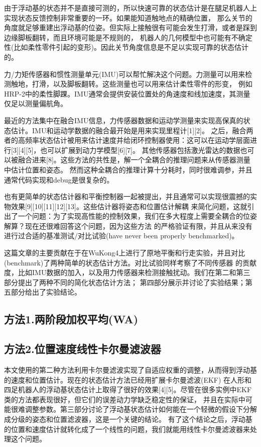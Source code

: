 由于浮动基的状态并不是直接可测的，所以快速可靠的状态估计是在腿足机器人上实现状态反馈控制非常重要的一环。如果能知道触地点的精确位置，
那么关节的角度就足够重建出浮动基的位姿。但实际上接触很有可能会发生打滑，或者是踩到边缘脚板翻转，而且环境可能是不规则的，
机器人的几何模型中也可能有不确定性(比如柔性零件引起的变形)。因此关节角度信息是不足以实现可靠的状态估计的。

力/力矩传感器和惯性测量单元(IMU)可以帮忙解决这个问题。力测量可以用来检测触地，打滑，以及脚板翻转。这些测量也可以用来估计柔性零件的形变，
例如HRP-2中的柔性脚踝。IMU通常会提供安装位置处的角速度和线加速度，其测量仅足以测量偏航角。

最近的方法集中在融合IMU信息，力传感器数据和运动学测量来实现高保真的状态估计。IMU和运动学数据的融合最开始是用来实现里程计[1][2]。
之后，融合两者的高频率状态估计被用来估计速度并给闭环控制器使用：这可以在运动学层面进行[3][4][5]，也可以扩展到动力学模型[6][7]。
其他传感器包括激光雷达的数据也可以被融合进来[8]。这些方法的共性是，解一个全耦合的推理问题来从传感器测量中估计位置和姿态。
然而这种全耦合的推理计算十分耗时，同时很难调参，并且通常代码实现和debug是很复杂的。

也有更简单的状态估计器和平衡控制器一起被提出，并且通常可以实现很震撼的实物效果[9][10][11][12][13]。这些估计器将姿态和位置估计解耦
来简化问题，这就引出了一个问题：为了实现高性能的控制效果，我们在多大程度上需要全耦合的位姿解算？现在还很难回答这个问题，因为这些方法
的严格验证有限，并且从来没有进行过合适的基准测试/对比试验(have never been properly benchmarked)。

这篇文章的主要贡献在于在WuKong4上进行了原地平衡和行走实验，并且对比(benchmark)了两种简单的状态估计方法。对比试验同样考察了不同传感器
的贡献度，比如IMU数据的加入，以及用力传感器来检测接触扰动。我们在第二和第三部分提出了两种不同的简化状态估计方法；
第四部分展示并讨论了实验结果；第五部分给出了实验结论。

\subsection{方法1.两阶段加权平均(WA)}

\subsection{方法2.位置速度线性卡尔曼滤波器}
本文使用的第二种方法利用卡尔曼滤波实现了自适应权重的调整，从而得到浮动基的速度和位置估计。现在的状态估计方法已经用扩展卡尔曼滤波(EKF)
在人形和四足机器人的浮动基状态估计上取得了很好的效果[4][5]。尽管在很多实例中EKF类的方法都表现很好，但它们的误差动力学缺乏稳定性的保证，
并且在实际中可能很难调整参数。第三部分讨论了浮动基状态估计如何能在一个轻微的假设下分解成分级的姿态和位置滤波器，这是一个关键的结论。
有了这个结论之后，浮动基的位置和速度估计就转化成了一个线性的问题，我们就能用线性卡尔曼滤波器来处理这个问题。

